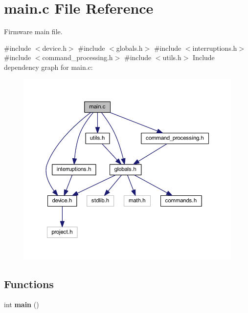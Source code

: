 \section{main.\+c File Reference}
\label{main_8c}


Firmware main file.  


{\ttfamily \#include $<$device.\+h$>$}\newline
{\ttfamily \#include $<$globals.\+h$>$}\newline
{\ttfamily \#include $<$interruptions.\+h$>$}\newline
{\ttfamily \#include $<$command\+\_\+processing.\+h$>$}\newline
{\ttfamily \#include $<$utils.\+h$>$}\newline
Include dependency graph for main.\+c\+:
\nopagebreak
\begin{figure}[H]
\begin{center}
\leavevmode
\includegraphics[width=350pt]{main_8c__incl}
\end{center}
\end{figure}
\subsection*{Functions}
\begin{DoxyCompactItemize}
\item 
\mbox{\label{main_8c_ae66f6b31b5ad750f1fe042a706a4e3d4}} 
int {\bfseries main} ()
\end{DoxyCompactItemize}


